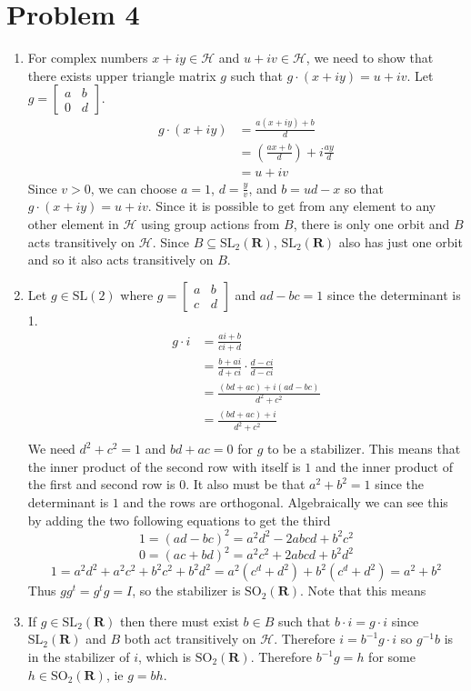 \documentclass{article}
\begin{document}
\section*{Problem 4}
\begin{enumerate}
	\item For complex numbers $x+iy\in \mathcal{H}$ and $u+iv\in \mathcal{H}$, we need to show that 
	there exists upper triangle matrix $g$ such that $g\cdot (x+iy) = u+iv$.
	Let $g = \begin{bmatrix}
		a & b \\
		0 & d 
	\end{bmatrix}$.
	\begin{align*}
		g\cdot (x+iy) &= \frac{a(x+iy) + b}{d} \\
		&= \left(\frac{ax+b}{d}\right)+i\frac{ay}{d} \\
		&= u + iv
	\end{align*}
	Since $v>0$, we can choose $a = 1$, $d= \frac{y}{v}$, and $b = ud-x$ so that 
	$g\cdot (x+iy) = u+iv$.
	Since it is possible to get from any element to any other element in $\mathcal{H}$
	using group actions from $B$, there is only one orbit and $B$ acts transitively on 
	$\mathcal{H}$. Since $B \subseteq \text{SL}_2(\textbf{R})$, 
	$\text{SL}_2(\textbf{R})$ also has just one orbit and so it also acts transitively on $B$.
	\item Let $g \in \text{SL}(2)$ where $g = \begin{bmatrix}
		a & b \\
		c & d 
	\end{bmatrix}$ and
	$ad-bc = 1$ since the determinant is 1.
	\begin{align*}
		g \cdot i &= \frac{ai + b}{ci+d} \\
		&= \frac{b + ai}{d + ci} \cdot \frac{d - ci}{d - ci} \\
		&= \frac{(bd+ac)+i(ad-bc)}{d^2+c^2} \\
		&= \frac{(bd+ac)+i}{d^2+c^2} \\
	\end{align*}
	We need $d^2+c^2 = 1$ and $bd+ac = 0$ for $g$ to be a stabilizer. This means that 
	the inner product of the second row with itself is $1$ and
	the inner product of the first and second row is $0$.
	It also must be that $a^2+b^2 = 1$ since the determinant is $1$
	and the rows are orthogonal.
	Algebraically we can see this by adding the two following equations
	to get the third
	\[
		1 =(ad-bc)^2 = a^2d^2 - 2abcd + b^2c^2
	\]
	\[
		0 = (ac+bd)^2 = a^2c^2 + 2abcd + b^2d^2
	\]
	\[
		1 = a^2d^2 + a^2c^2 + b^2c^2 + b^2d^2 = a^2(c^d+d^2) + b^2(c^d+d^2) = a^2+b^2
	\]
	Thus $gg^t = g^tg = I$,
	so the stabilizer is $\text{SO}_2(\textbf{R})$.
	Note that this means
	\item If $g \in \text{SL}_2(\textbf{R})$ then there must 
	exist $b \in B$ such that 
	$b\cdot i = g\cdot i$ since $\text{SL}_2(\textbf{R})$
	and $B$ both act transitively on $\mathcal{H}$.
	Therefore $i = b^{-1}g \cdot i$ so $g^{-1}b$ is in the stabilizer of $i$,
	which is $\text{SO}_2(\textbf{R})$.
	Therefore $b^{-1}g = h$ for some $h \in \text{SO}_2(\textbf{R})$,
	ie $g = bh$.

\end{enumerate}

\newpage
\end{document}
